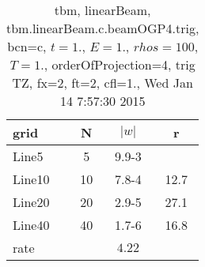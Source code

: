 \begin{table}[hbt]\tableFont %
\begin{center}
\begin{tabular}{|l|c|c|c|} \hline 
grid  & N &  $\vert w \vert$   & r \\ \hline 
               Line5 &     5 & \num{9.9}{-3} &       \\ \hline
              Line10 &    10 & \num{7.8}{-4} & 12.7  \\ \hline
              Line20 &    20 & \num{2.9}{-5} & 27.1  \\ \hline
              Line40 &    40 & \num{1.7}{-6} & 16.8  \\ \hline
    rate             &       &  $4.22$       &       \\ \hline
\end{tabular}
\caption{tbm, linearBeam, tbm.linearBeam.c.beamOGP4.trig, bcn=c, $ t=1.$, $ E=1.$, $ rhos=100$, $ T=1.$,  orderOfProjection=4, trig TZ, fx=2, ft=2, cfl=1., Wed Jan 14  7:57:30 2015}\label{table:tbm.linearBeam.c.beamOGP4.trig}
\end{center}
\end{table}
